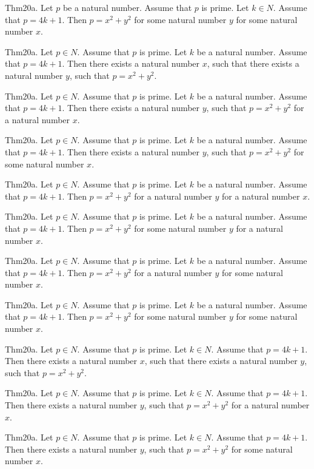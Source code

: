 \documentclass{article}
\begin{document}
Thm20a. Let $p$ be a natural number. Assume that $p$ is prime. Let $k \in N$. Assume that $p = 4 k + 1$. Then $p = x ^{ 2}+ y ^{ 2}$ for some natural number $y$ for some natural number $x$.

Thm20a. Let $p \in N$. Assume that $p$ is prime. Let $k$ be a natural number. Assume that $p = 4 k + 1$. Then there exists a natural number $x$, such that there exists a natural number $y$, such that $p = x ^{ 2}+ y ^{ 2}$.

Thm20a. Let $p \in N$. Assume that $p$ is prime. Let $k$ be a natural number. Assume that $p = 4 k + 1$. Then there exists a natural number $y$, such that $p = x ^{ 2}+ y ^{ 2}$ for a natural number $x$.

Thm20a. Let $p \in N$. Assume that $p$ is prime. Let $k$ be a natural number. Assume that $p = 4 k + 1$. Then there exists a natural number $y$, such that $p = x ^{ 2}+ y ^{ 2}$ for some natural number $x$.

Thm20a. Let $p \in N$. Assume that $p$ is prime. Let $k$ be a natural number. Assume that $p = 4 k + 1$. Then $p = x ^{ 2}+ y ^{ 2}$ for a natural number $y$ for a natural number $x$.

Thm20a. Let $p \in N$. Assume that $p$ is prime. Let $k$ be a natural number. Assume that $p = 4 k + 1$. Then $p = x ^{ 2}+ y ^{ 2}$ for some natural number $y$ for a natural number $x$.

Thm20a. Let $p \in N$. Assume that $p$ is prime. Let $k$ be a natural number. Assume that $p = 4 k + 1$. Then $p = x ^{ 2}+ y ^{ 2}$ for a natural number $y$ for some natural number $x$.

Thm20a. Let $p \in N$. Assume that $p$ is prime. Let $k$ be a natural number. Assume that $p = 4 k + 1$. Then $p = x ^{ 2}+ y ^{ 2}$ for some natural number $y$ for some natural number $x$.

Thm20a. Let $p \in N$. Assume that $p$ is prime. Let $k \in N$. Assume that $p = 4 k + 1$. Then there exists a natural number $x$, such that there exists a natural number $y$, such that $p = x ^{ 2}+ y ^{ 2}$.

Thm20a. Let $p \in N$. Assume that $p$ is prime. Let $k \in N$. Assume that $p = 4 k + 1$. Then there exists a natural number $y$, such that $p = x ^{ 2}+ y ^{ 2}$ for a natural number $x$.

Thm20a. Let $p \in N$. Assume that $p$ is prime. Let $k \in N$. Assume that $p = 4 k + 1$. Then there exists a natural number $y$, such that $p = x ^{ 2}+ y ^{ 2}$ for some natural number $x$.
\end{document}

